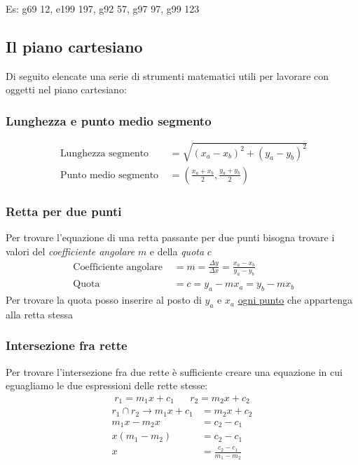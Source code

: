 Es: g69 12, e199 197, g92 57, g97 97, g99 123

\subsection{Il piano cartesiano}
Di seguito elencate una serie di strumenti matematici utili per lavorare con oggetti nel piano cartesiano:
\subsubsection{Lunghezza e punto medio segmento}
\begin{align*}
	\text{ Lunghezza segmento }   & = \sqrt{\left( x_a - x_b\right)^2 + \left( y_a - y_b\right)^2 } \\
	\text{ Punto medio segmento } & = \left(\frac{x_a + x_b}{2}, \frac{y_a+y_b}{2}\right)
\end{align*}
\subsubsection{Retta per due punti}
Per trovare l'equazione di una retta passante per due punti bisogna trovare i valori del \textit{coefficiente angolare} $ m $ e della \textit{quota} $ c $
\begin{align*}
	\text{ Coefficiente angolare } & = m = \frac{\Delta y}{\Delta x} = \frac{x_a - x_b}{y_a - y_b} \\
	\text{ Quota }                 & = c = y_a - mx_a = y_b - mx_b
\end{align*}
Per trovare la quota posso inserire al posto di $ y_a $ e $ x_a $ \underline{ogni punto} che appartenga alla retta stessa
\subsubsection{Intersezione fra rette}
Per trovare l'intersezione fra due rette è sufficiente creare una equazione in cui eguagliamo le due espressioni delle rette stesse:
\begin{align*}
	r_1 = m_1x + c_1 &  & r_2 = m_2x + c_2
\end{align*}
\begin{align*}
	r_1 \cap r_2 \rightarrow m_1x + c_1 & = m_2x + c_2                  \\
	m_1x - m_2x                         & = c_2 - c_1                   \\
	x \left(m_1 - m_2\right)            & = c_2 - c_1                   \\
	x                                   & = \frac{c_2 - c_1}{m_1 - m_2}
\end{align*}
